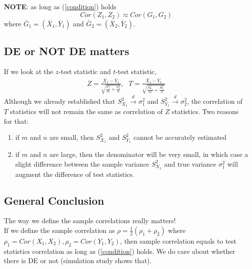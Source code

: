 \documentclass[12pt,oneside]{book}
\begin{document}
\textbf{NOTE}:  as long as (\ref{condition}) holds
\[  Cor(Z_1, Z_2 )\approx Cor(G_1,G_2) \]
where $\bar{G}_1 = (\bar{X}_1, \bar{Y}_1)$ and $\bar{G}_2 = (\bar{X}_2, \bar{Y}_2)$. \\


\subsection*{DE or NOT DE matters}
If we look at the $z$-test statistic and $t$-test statistic, 
\begin{align*}
Z = \frac{\bar{X}_{1}-\bar{Y}_{1} }{\sqrt{\frac{\sigma^2_1}{m} + \frac{\sigma^2_2}{n}}},~~~T = \frac{\bar{X}_1 -\bar{Y}_1}{\sqrt{\frac{S_{X_1}^2}{m} + \frac{S_{Y_1}^2}{n}}}
\end{align*}
Although we already established that $S_{X_1}^2 \stackrel{d}{\rightarrow} \sigma_1^2$ and $S_{Y_1}^2 \stackrel{d}{\rightarrow} \sigma_2^2$,  the correlation of $T$ statistics will not remain the same as correlation of $Z$ statistics.  Two reasons for that:
\begin{enumerate}
\item if $m$ and $n$ are small, then $S_{X_1}^2$ and $S_{Y_1}^2$ cannot be accurately estimated
\item if $m$ and $n$ are large, then the denominator will be very small, in which case a slight difference between the sample variance  $S_{X_1}^2$ and true variance  $\sigma^2_1$ will augment the difference of test statistics. 
\end{enumerate}
\subsection*{General Conclusion}
The way we define the sample correlations really matters! \\

If we define the sample correlation as $\rho = \frac{1}{2}(\rho_1 + \rho_2)$ where $\rho_1 = Cor(X_1, X_2), \rho_2=Cor(Y_1, Y_2)$, then sample correlation equals to test statistics correlation as long as (\ref{condition}) holds. We do care about whether there is DE or not (simulation study shows that). \\
\end{document}

